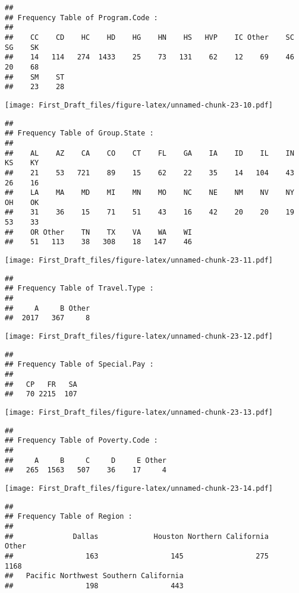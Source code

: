 \documentclass[
]{article}
\begin{document}
\begin{verbatim}
## 
## Frequency Table of Program.Code :
## 
##    CC    CD    HC    HD    HG    HN    HS   HVP    IC Other    SC    SG    SK 
##    14   114   274  1433    25    73   131    62    12    69    46    20    68 
##    SM    ST 
##    23    28
\end{verbatim}

\texttt{[image: First\_Draft\_files/figure-latex/unnamed-chunk-23-10.pdf]}

\begin{verbatim}
## 
## Frequency Table of Group.State :
## 
##    AL    AZ    CA    CO    CT    FL    GA    IA    ID    IL    IN    KS    KY 
##    21    53   721    89    15    62    22    35    14   104    43    26    16 
##    LA    MA    MD    MI    MN    MO    NC    NE    NM    NV    NY    OH    OK 
##    31    36    15    71    51    43    16    42    20    20    19    53    33 
##    OR Other    TN    TX    VA    WA    WI 
##    51   113    38   308    18   147    46
\end{verbatim}

\texttt{[image: First\_Draft\_files/figure-latex/unnamed-chunk-23-11.pdf]}

\begin{verbatim}
## 
## Frequency Table of Travel.Type :
## 
##     A     B Other 
##  2017   367     8
\end{verbatim}

\texttt{[image: First\_Draft\_files/figure-latex/unnamed-chunk-23-12.pdf]}

\begin{verbatim}
## 
## Frequency Table of Special.Pay :
## 
##   CP   FR   SA 
##   70 2215  107
\end{verbatim}

\texttt{[image: First\_Draft\_files/figure-latex/unnamed-chunk-23-13.pdf]}

\begin{verbatim}
## 
## Frequency Table of Poverty.Code :
## 
##     A     B     C     D     E Other 
##   265  1563   507    36    17     4
\end{verbatim}

\texttt{[image: First\_Draft\_files/figure-latex/unnamed-chunk-23-14.pdf]}

\begin{verbatim}
## 
## Frequency Table of Region :
## 
##              Dallas             Houston Northern California               Other 
##                 163                 145                 275                1168 
##   Pacific Northwest Southern California 
##                 198                 443
\end{verbatim}
\end{document}
